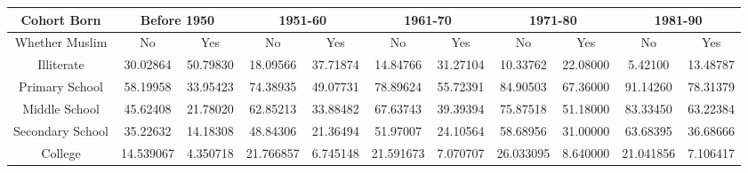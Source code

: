 \begin{tabular}{ccccccccccc}
\hline
Cohort Born & \multicolumn{2}{c}{Before 1950} & \multicolumn{2}{c}{1951-60} & \multicolumn{2}{c}{1961-70} & \multicolumn{2}{c}{1971-80} & \multicolumn{2}{c}{1981-90} \\ \hline
Whether Muslim   & No        & Yes      & No        & Yes      & No        & Yes      & No        & Yes      & No        & Yes      \\ \hline
Illiterate       & 30.02864  & 50.79830 & 18.09566  & 37.71874 & 14.84766  & 31.27104 & 10.33762  & 22.08000 & 5.42100   & 13.48787 \\
Primary School   & 58.19958  & 33.95423 & 74.38935  & 49.07731 & 78.89624  & 55.72391 & 84.90503  & 67.36000 & 91.14260  & 78.31379 \\
Middle School    & 45.62408  & 21.78020 & 62.85213  & 33.88482 & 67.63743  & 39.39394 & 75.87518  & 51.18000 & 83.33450  & 63.22384 \\
Secondary School & 35.22632  & 14.18308 & 48.84306  & 21.36494 & 51.97007  & 24.10564 & 58.68956  & 31.00000 & 63.68395  & 36.68666 \\
College          & 14.539067 & 4.350718 & 21.766857 & 6.745148 & 21.591673 & 7.070707 & 26.033095 & 8.640000 & 21.041856 & 7.106417 \\ \hline
\end{tabular}

